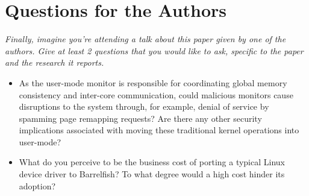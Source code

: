 \documentclass[11pt]{article}
\begin{document}
\section*{Questions for the Authors}
\textsl{Finally, imagine you're attending a talk about this paper given by one of the authors. Give at least 2 questions that you would like to ask, specific to the paper and the research it reports.}


\begin{itemize}
	\item As the user-mode monitor is responsible for coordinating global memory consistency and inter-core communication, could malicious monitors cause disruptions to the system through, for example, denial of service by spamming page remapping requests? Are there any other security implications associated with moving these traditional kernel operations into user-mode?
	\item What do you perceive to be the business cost of porting a typical Linux device driver to Barrelfish? To what degree would a high cost hinder its adoption?
\end{itemize}


\footnotesize{}
\end{document}
